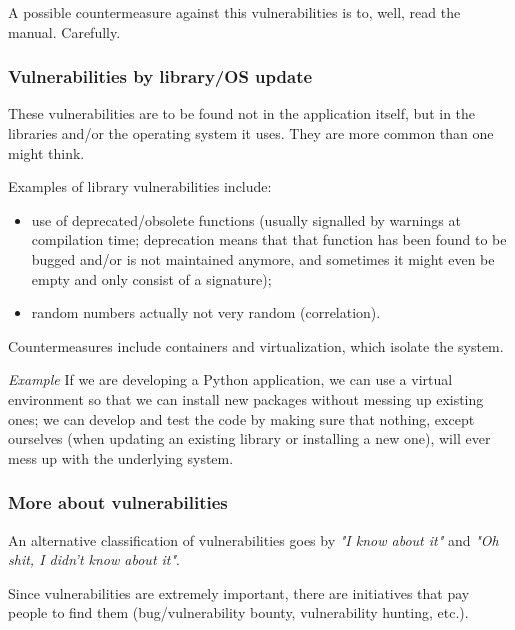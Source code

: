 A possible countermeasure against this vulnerabilities is to, well, read the manual. Carefully.


\subsubsection*{Vulnerabilities by library/OS update}
These vulnerabilities are to be found not in the application itself, but in the libraries and/or the operating system it uses. They are more common than one might think.

Examples of library vulnerabilities include:

\begin{itemize}
    \item use of deprecated/obsolete functions (usually signalled by warnings at compilation time; deprecation means that that function has been found to be bugged and/or is not maintained anymore, and sometimes it might even be empty and only consist of a signature);
    \item random numbers actually not very random (correlation).
\end{itemize}

Countermeasures include containers and virtualization, which isolate the system.

\vspace{0.5em}

\emph{Example} If we are developing a Python application, we can use a virtual environment so that we can install new packages without messing up existing ones; we can develop and test the code by making sure that nothing, except ourselves (when updating an existing library or installing a new one), will ever mess up with the underlying system.

\vspace{0.5em}


\subsubsection*{More about vulnerabilities}
An alternative classification of vulnerabilities goes by \textit{"I know about it"} and \textit{"Oh shit, I didn't know about it"}.

Since vulnerabilities are extremely important, there are initiatives that pay people to find them (bug/vulnerability bounty, vulnerability hunting, etc.).

